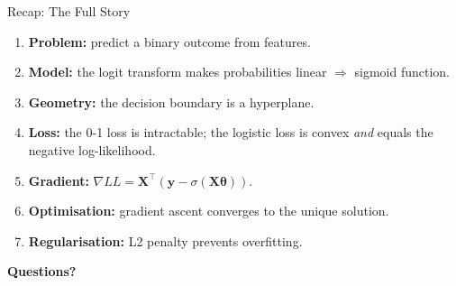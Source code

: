 \documentclass[aspectratio=169, professionalfonts]{beamer}
\begin{document}
\begin{frame}{Recap: The Full Story}

\begin{enumerate}
  \item \textbf{Problem:} predict a binary outcome from features.
  \item \textbf{Model:} the logit transform makes probabilities linear
        $\Rightarrow$ sigmoid function.
  \item \textbf{Geometry:} the decision boundary is a hyperplane.
  \item \textbf{Loss:} the 0-1 loss is intractable; the logistic loss
        is convex \emph{and} equals the negative log-likelihood.
  \item \textbf{Gradient:}
        $\nabla LL = \mathbf{X}^\top(\mathbf{y}-\sigma(\mathbf{X}\bm{\theta}))$.
  \item \textbf{Optimisation:} gradient ascent converges to the unique
        solution.
  \item \textbf{Regularisation:} L2 penalty prevents overfitting.
\end{enumerate}

\end{frame}

{
\begin{frame}[c]
\centering
\Huge\textbf{Questions?}
\end{frame}
}
\end{document}

